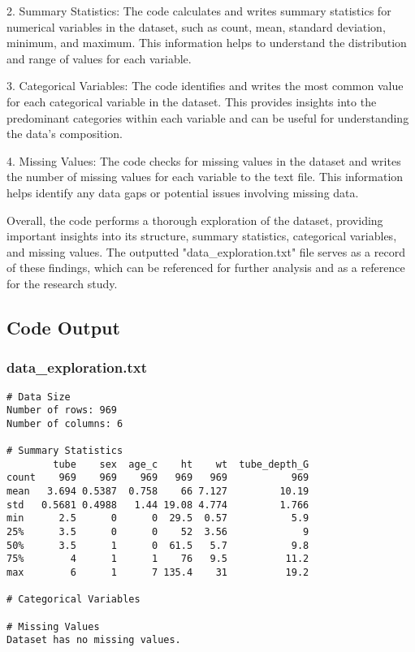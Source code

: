 \documentclass[11pt]{article}
\begin{document}
2. Summary Statistics: The code calculates and writes summary statistics for numerical variables in the dataset, such as count, mean, standard deviation, minimum, and maximum. This information helps to understand the distribution and range of values for each variable.

3. Categorical Variables: The code identifies and writes the most common value for each categorical variable in the dataset. This provides insights into the predominant categories within each variable and can be useful for understanding the data's composition.

4. Missing Values: The code checks for missing values in the dataset and writes the number of missing values for each variable to the text file. This information helps identify any data gaps or potential issues involving missing data.

Overall, the code performs a thorough exploration of the dataset, providing important insights into its structure, summary statistics, categorical variables, and missing values. The outputted "data\_exploration.txt" file serves as a record of these findings, which can be referenced for further analysis and as a reference for the research study.

\subsection{Code Output}

\subsubsection*{data\_exploration.txt}

\begin{Verbatim}[tabsize=4]
# Data Size
Number of rows: 969
Number of columns: 6

# Summary Statistics
        tube    sex  age_c    ht    wt  tube_depth_G
count    969    969    969   969   969           969
mean   3.694 0.5387  0.758    66 7.127         10.19
std   0.5681 0.4988   1.44 19.08 4.774         1.766
min      2.5      0      0  29.5  0.57           5.9
25%      3.5      0      0    52  3.56             9
50%      3.5      1      0  61.5   5.7           9.8
75%        4      1      1    76   9.5          11.2
max        6      1      7 135.4    31          19.2

# Categorical Variables

# Missing Values
Dataset has no missing values.

\end{Verbatim}
\end{document}
